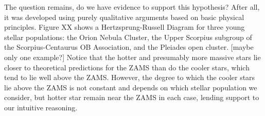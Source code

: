 The question remains, do we have evidence to support this hypothesis? After all, it was developed using purely qualitative arguments based on basic physical principles. Figure XX shows a Hertzsprung-Russell Diagram for three young stellar populations: the Orion Nebula Cluster, the Upper Scorpius subgroup of the Scorpius-Centaurus OB Association, and the Pleiades open cluster. [maybe only one example?] Notice that the hotter and presumably more massive stars lie closer to theoretical predictions for the ZAMS than do the cooler stars, which tend to lie well above the ZAMS. However, the degree to which the cooler stars lie above the ZAMS is not constant and depends on which stellar population we consider, but hotter star remain near the ZAMS in each case, lending support to our intuitive reasoning.